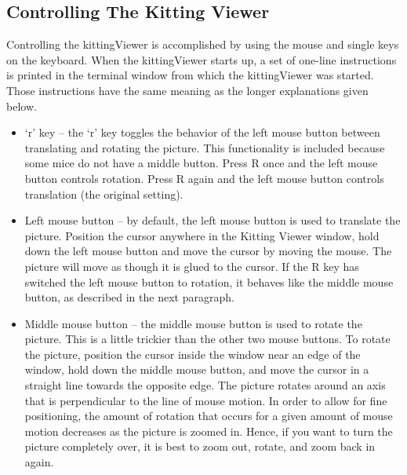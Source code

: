 \subsection{Controlling The Kitting Viewer}
Controlling the kittingViewer is accomplished by using the mouse and single
keys on the keyboard. When the kittingViewer starts up, a set of one-line
instructions is printed in the terminal window from which the
kittingViewer was started. Those instructions have the same meaning as
the longer explanations given below.\\

\begin{itemize}

\item \lq{}r\rq{} key -- the \lq{}r\rq{} key toggles the behavior of the left mouse button
  between translating and rotating the picture. This functionality is
  included because some mice do not have a middle button. Press R once and
  the left mouse button controls rotation. Press R again and the left
  mouse button controls translation (the original setting).\\

\item Left mouse button -- by default, the left mouse button is used to
  translate the picture. Position the cursor anywhere in the Kitting Viewer
  window, hold down the left mouse button and move the cursor by moving the
  mouse. The picture will move as though it is glued to the cursor. If the
  R key has switched the left mouse button to rotation, it behaves like the
  middle mouse button, as described in the next paragraph.\\

\item Middle mouse button -- the middle mouse button is used to rotate the
  picture. This is a little trickier than the other two mouse buttons. To
  rotate the picture, position the cursor inside the window near an edge of
  the window, hold down the middle mouse button, and move the cursor in a
  straight line towards the opposite edge. The picture rotates around an axis
  that is perpendicular to the line of mouse motion. In order
  to allow for fine positioning, the amount of rotation that occurs for a
  given amount of mouse motion decreases as the picture is zoomed
  in. Hence, if you want to turn the picture completely over, it is best to
  zoom out, rotate, and zoom back in again.\\


\end{itemize}
